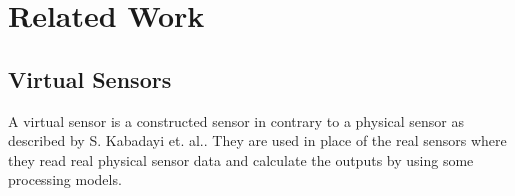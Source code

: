 \documentclass[USenglish]{uit-thesis}
\begin{document}
\chapter{Related Work}

\section{Virtual Sensors}
A virtual sensor is a constructed sensor in contrary to a physical sensor as described by S. Kabadayi et. al.\cite{VirtualSensors2006}. They are used in place of the real sensors where they read real physical sensor data and calculate the outputs by using some processing models.
\end{document}
